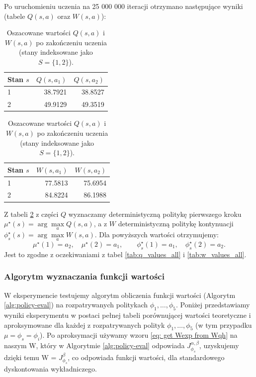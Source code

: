 Po uruchomieniu uczenia na 25 000 000 iteracji otrzymano następujące wyniki (tabele $Q(s,a)$ oraz $W(s,a)$):

\begin{table}[h!]
\centering
\caption{Oszacowane wartości $Q(s,a)$ i $W(s,a)$ po zakończeniu uczenia (stany indeksowane jako $S=\{1,2\}$).}
\label{tab:two_state_learned_qw}
\begin{minipage}[t]{0.48\textwidth}
\centering
\begin{tabular}{lrr}
	\toprule
	\textbf{Stan $s$} & $Q(s,a_1)$ & $Q(s,a_2)$ \\
\midrule
1 & 38.7921 & 38.8527 \\
2 & 49.9129 & 49.3519 \\
\bottomrule
\end{tabular}
\end{minipage}
\hfill
\begin{minipage}[t]{0.48\textwidth}
\centering
\begin{tabular}{lrr}
	\toprule
	\textbf{Stan $s$} & $W(s,a_1)$ & $W(s,a_2)$ \\
\midrule
1 & 77.5813 & 75.6954 \\
2 & 84.8224 & 86.1988 \\
\bottomrule
\end{tabular}
\end{minipage}
\end{table}

Z tabeli \ref{tab:two_state_learned_qw}  z części $Q$ wyznaczamy deterministyczną politykę pierwszego kroku
\(\mu^\star(s)=\arg\max\limits_{a} Q(s,a)\), a z $W$ deterministyczną politykę kontynuacji
\(\phi_s^\star(s)=\arg\max\limits_{a} W(s,a)\). Dla powyższych wartości otrzymujemy:
\[
\mu^\star(1)=a_2,\quad \mu^\star(2)=a_1,\qquad
\phi_s^\star(1)=a_1,\quad \phi_s^\star(2)=a_2.
\]
Jest to zgodne z oczekiwaniami z tabel \ref{tab:q_values_all} i \ref{tab:w_values_all}.


\subsubsection{Algorytm wyznaczania funkcji wartości}
W eksperymencie testujemy algorytm obliczenia funkcji wartości (Algorytm \ref{alg:policy-eval}) na rozpatrywanych politykach \(\phi_1, \ldots, \phi_5\). Poniżej przedstawiamy wyniki eksperymentu w postaci pełnej tabeli porównującej wartości teoretyczne i aproksymowane dla każdej z rozpatrywanych polityk \(\phi_1,\dots,\phi_5\) (w tym przypadku $\mu=\phi_s=\phi_i$). Po aproksymacji używamy wzoru \ref{eq: get Wexp from Wqh} na naszym W, który w Algorytmie \ref{alg:policy-eval} odpowiada $J^{\alpha,\beta}_{\phi_s}$, uzyskujemy dzięki temu W = $J^{\beta}_{\phi_s}$, co odpowiada funkcji wartości, dla standardowego dyskontowania wykładniczego.

